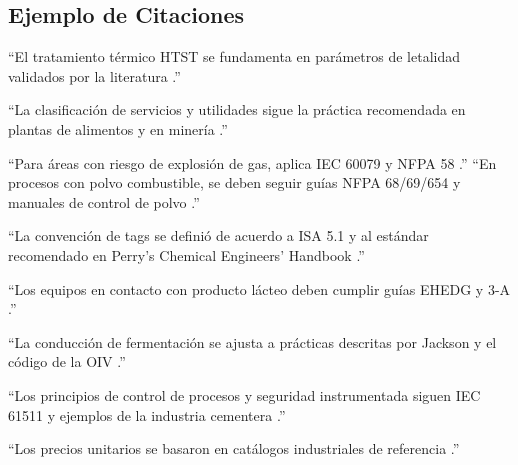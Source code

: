 \documentclass[12pt,letterpaper]{report}
\begin{document}
	\subsection*{Ejemplo de Citaciones}
	
	“El tratamiento térmico HTST se fundamenta en parámetros de letalidad validados por la literatura \cite{walstra2006,tetrapak2025}.”
	
	“La clasificación de servicios y utilidades sigue la práctica recomendada en plantas de alimentos y en minería \cite{niosh2019}.”

	“Para áreas con riesgo de explosión de gas, aplica IEC 60079 y NFPA 58 \cite{iec60079,nfpa58_2024}.”
	“En procesos con polvo combustible, se deben seguir guías NFPA 68/69/654 y manuales de control de polvo \cite{niosh2019}.”
	
	“La convención de tags se definió de acuerdo a ISA 5.1 y al estándar recomendado en Perry’s Chemical Engineers’ Handbook \cite{wills2015}.”
	
	“Los equipos en contacto con producto lácteo deben cumplir guías EHEDG y 3-A \cite{tetrapak2025}.”
	
	“La conducción de fermentación se ajusta a prácticas descritas por Jackson \cite{jackson2014} y el código de la OIV \cite{oiv2022}.”
	
	“Los principios de control de procesos y seguridad instrumentada siguen IEC 61511 y ejemplos de la industria cementera \cite{alsop2019}.”
	
	“Los precios unitarios se basaron en catálogos industriales de referencia \cite{tetrapak2025,alsop2019}.”
	
\end{document}
